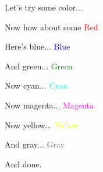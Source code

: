 \documentclass[letterpaper]{article}
\begin{document}
Let's try some color...

Now how about some \textcolor{red}{Red}

Here's blue... \textcolor{blue}{Blue}

And green... \textcolor{green}{Green}

Now cyan... \textcolor{cyan}{Cyan}

Now magenta... \textcolor{magenta}{Magenta}

Now yellow... \textcolor{yellow}{Yellow}

And gray... \textcolor{gray}{Gray}

And done.
\end{document}
